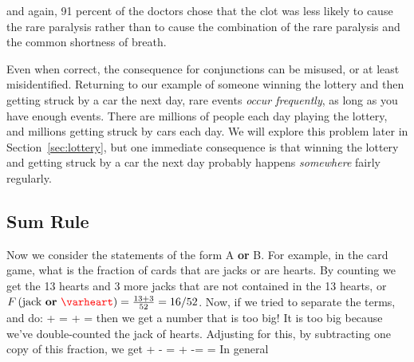 and again, 91 percent of the doctors chose that the clot was less likely to cause the rare paralysis rather than to cause the combination of the rare paralysis and the common shortness of breath.

Even when correct, the consequence for conjunctions can be misused, or at least misidentified.  Returning to our example of someone winning the lottery and then getting struck by a car the next day, rare events {\em occur frequently}, as long as you have enough events.  There are millions of people each day playing the lottery, and millions getting struck by cars each day.  We will explore this problem later in Section~\ref{sec:lottery}, but one immediate consequence is that winning the lottery and getting struck by a car the next day probably happens {\em somewhere} fairly regularly.



\subsection{Sum Rule}\label{sec:sumrule}

Now we consider the statements of the form A {\bf or} B.  For example, in the card game, what is the fraction of cards that are jacks or are hearts.  By counting we get the 13 hearts and 3 more jacks that are not contained in the 13 hearts, or $\F{jack {\bf or} $\hearts$}=\frac{13+3}{52}=16/52$.  Now, if we tried to separate the terms, and do:
\beqn
{} + \F{$\hearts$} =  +  =
\eeqn  
then we get a number that is too big!  It is too big because we've double-counted the jack of hearts.  Adjusting for this, by subtracting one copy of this fraction, we get
\beqn
{} + \F{$\hearts$} - =  +  -= = 
\eeqn  
In general 


